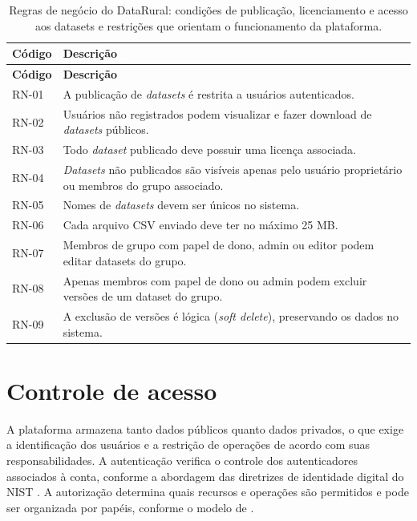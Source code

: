\begin{longtable}{p{}p{}}
\caption{Regras de negócio do DataRural: condições de publicação, licenciamento e acesso aos datasets e restrições que orientam o funcionamento da plataforma.}\label{tab:regras_negocio}\\
\toprule
\textbf{Código} & \textbf{Descrição} \\
\midrule
\endfirsthead
\toprule
\textbf{Código} & \textbf{Descrição} \\
\midrule
\endhead
RN-01 & A publicação de \textit{datasets} é restrita a usuários autenticados. \\
RN-02 & Usuários não registrados podem visualizar e fazer download de \textit{datasets} públicos. \\
RN-03 & Todo \textit{dataset} publicado deve possuir uma licença associada. \\
RN-04 & \textit{Datasets} não publicados são visíveis apenas pelo usuário proprietário ou membros do grupo associado. \\
RN-05 & Nomes de \textit{datasets} devem ser únicos no sistema. \\
RN-06 & Cada arquivo CSV enviado deve ter no máximo 25 MB. \\
RN-07 & Membros de grupo com papel de dono, admin ou editor podem editar datasets do grupo. \\
RN-08 & Apenas membros com papel de dono ou admin podem excluir versões de um dataset do grupo. \\
RN-09 & A exclusão de versões é lógica (\textit{soft delete}), preservando os dados no sistema. \\
\bottomrule
\end{longtable}

\section{Controle de acesso}\label{sec:controle_acesso}

A plataforma armazena tanto dados públicos quanto dados privados, o que exige a identificação dos usuários e a restrição de operações de acordo com suas responsabilidades. A autenticação verifica o controle dos autenticadores associados à conta, conforme a abordagem das diretrizes de identidade digital do NIST \cite{nist2025passwords}. A autorização determina quais recursos e operações são permitidos e pode ser organizada por papéis, conforme o modelo de .

